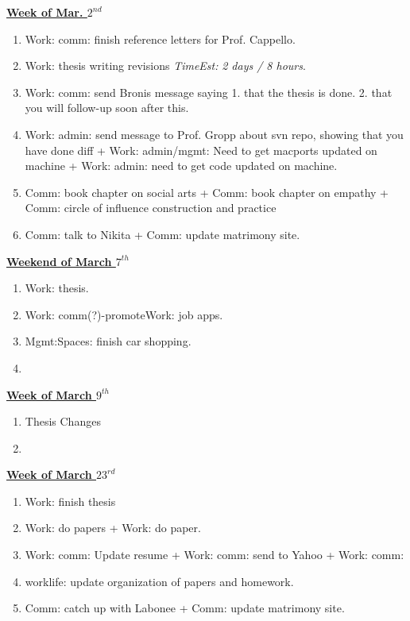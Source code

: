 \documentclass[serif, mathserif, final]{beamer}
\newcommand{\te}[1]{\textit{TimeEst:} \textit{#1}}
\begin{document}
{\small \underline{\textbf{Week of Mar. $2^{nd}$}} }\\
\begin{enumerate} 
\item \small Work: comm: finish reference letters for Prof. Cappello.  
\item \small Work: thesis writing revisions \te {2 days / 8
  hours}. 
\item \small Work: comm: send Bronis message saying
  1. that the thesis is done.  2. that you will follow-up
  soon after this.
\item \small Work: admin: send message to Prof. Gropp about
  svn repo, showing that you have done diff   + Work:
  admin/mgmt: Need to get macports updated on machine +
  Work: admin: need to get code updated on machine. 
\item \small Comm: book chapter on social arts + Comm: book
  chapter on empathy + Comm: circle of influence construction and
  practice 
\item \small Comm: talk to Nikita + Comm: update matrimony site. 
\end{enumerate}


{\small \underline{\textbf{Weekend of March $7^{th}$}}}\\
\begin{enumerate} 
  \small \item \small Work: thesis. 
\item \small Work: comm(?)-promoteWork: job apps. 
\item \small Mgmt:Spaces: finish car shopping.
\item \small 
\end{enumerate} 

{\small \underline{\textbf{Week of March $9^{th}$}}}\\  
\begin{enumerate} 
  \small \item \small Thesis Changes  
\item \small 
\end{enumerate} 

{\small \underline{\textbf{Week of March $23^{rd}$}}}\\  
\begin{enumerate} 
  \small \item \small Work: finish thesis 
  \small \item \small Work: do papers + Work: do paper. 
  \small \item \small Work: comm: Update resume  + Work: comm: send to
  Yahoo + Work: comm: 
\item \small worklife: update organization of papers and homework. 
\item \small Comm: catch up with Labonee + Comm: update matrimony
  site. 
\end{enumerate} 
\end{document}
